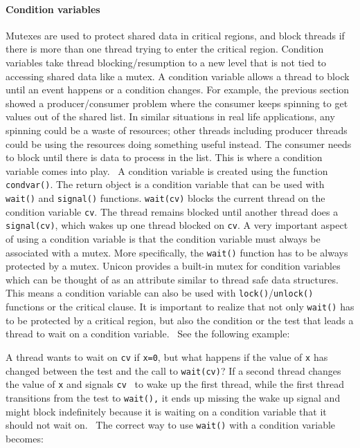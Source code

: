 \paragraph[Condition variables]{Condition variables}
Mutexes are used to protect shared data in critical regions, and block
threads if there is more than one thread trying to enter the critical
region. Condition variables take thread blocking/resumption to a new
level that is not tied to accessing shared data like a mutex. A
condition variable allows a thread to block until an event happens or a
condition changes. For example, the previous section showed a
producer/consumer problem where the consumer keeps spinning to get
values out of the shared list. In similar situations in real life
applications, any spinning could be a waste of resources; other threads
including producer threads could be using the resources doing something
useful instead. The consumer needs to block until there is data to
process in the list. This is where a condition variable comes into
play. \ A condition variable is created using the function
\texttt{condvar()}. The return object is a condition
variable that can be used with \texttt{wait()} and
\texttt{signal()} functions. \texttt{wait(cv)}
blocks the current thread on the condition variable
\texttt{cv}. The thread remains blocked until another
thread does a \texttt{signal(cv)}, which wakes up one thread
blocked on \texttt{cv}. A very important aspect of
using a condition variable is that the condition variable must always
be associated with a mutex. More specifically, the
\texttt{wait()} function has to be always protected by a
mutex. Unicon provides a built-in mutex for condition variables which
can be thought of as an attribute similar to thread safe data
structures. This means a condition variable can also be used with
\texttt{lock()}/\texttt{unlock()} functions or
the critical clause. It is important to realize that not only
\texttt{wait()} has to be protected by a critical region,
but also the condition or the test that leads a thread to wait on a
condition variable. \ See the following example:


A thread wants to wait on \texttt{cv} if
\texttt{x=0}, but what happens if the value of
\texttt{x} has changed between the test and the call to
\texttt{wait(cv)}? If a second thread changes the value of
\texttt{x} and signals \texttt{cv} \ to wake up
the first thread, while the first thread transitions from the test to
\texttt{wait()}\texttt{,} it ends up missing the
wake up signal and might block indefinitely because it is waiting on a
condition variable that it should not wait on. \ The correct way to use
\texttt{wait()} with a condition variable becomes:

